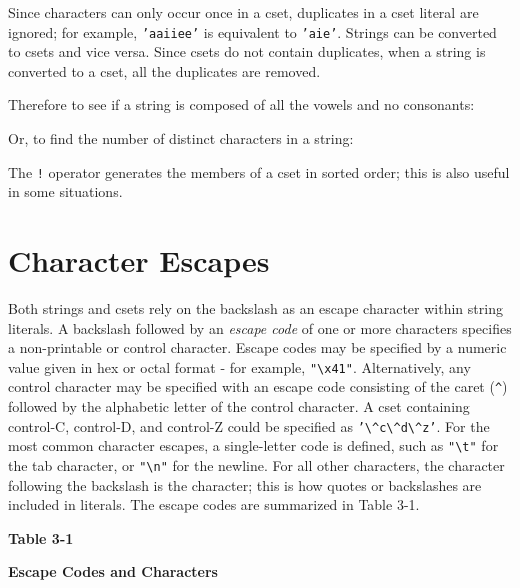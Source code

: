 
Since characters can only occur once in a cset, duplicates in a cset
literal are ignored; for example,
\texttt{'aaiiee'} is equivalent to
\texttt{'aie'}. Strings can be
converted to csets and vice versa. Since csets do not contain
duplicates, when a string is converted to a cset, all the duplicates
are removed.

Therefore to see if a string is composed of all the vowels and no
consonants:


Or, to find the number of distinct characters in a string:


The \texttt{!} operator generates the members of a cset in sorted order;
this is also useful in some situations.

\section{Character Escapes}

Both strings and csets rely on the backslash as an escape character
within string literals. A backslash followed by an \textit{escape code} of one or more characters specifies a
non-printable or control character. Escape codes may be specified by a
numeric value given in hex or octal format - for example,
\texttt{"{\textbackslash}x41"}.
Alternatively, any control character may be specified with an escape
code consisting of the caret (\texttt{\^{}}) followed by the alphabetic
letter of the control character. A cset containing control-C,
control-D, and control-Z could be specified as
\texttt{'{\textbackslash}\^{}c{\textbackslash}\^{}d{\textbackslash}\^{}z'}.
For the most common character escapes, a single-letter code is defined,
such as \texttt{"{\textbackslash}t"} for
the tab character, or
\texttt{"{\textbackslash}n"} for the
newline. For all other characters, the character following the
backslash is the character; this is how quotes or backslashes are
included in literals. The escape codes are summarized in Table 3-1.


{\centering\sffamily\bfseries
Table 3-1
\par}

{\centering\sffamily\bfseries
Escape Codes and Characters 
\par}

